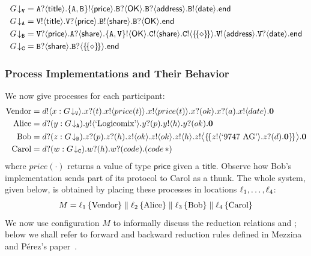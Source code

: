 \documentclass[runningheads,plain]{llncs}
\begin{document}
\begin{align*}
\tproj{G}{\pS} & = \ltinp{A}{\mathsf{title}}{\ltout{\{A,B\}}{\mathsf{price}}{\ltinp{B}{\mathsf{OK}}{\ltinp{B}{\mathsf{address}}{\ltout{B}{\mathsf{date}}{\lend}}}}}
\\
\tproj{G}{\pA} & = \ltout{\pS}{\mathsf{title}}{\ltinp{\pS}{\mathsf{price}}{\ltout{B}{\mathsf{share}}{\ltinp{B}{\mathsf{OK}}{\lend}}}}
\\
\tproj{G}{\pB} & = \ltinp{\pS}{\mathsf{price}}{\ltinp{A}{\mathsf{share}}{\ltout{\{A,\pS\}}{\mathsf{OK}}{
\ltout{C}{\mathsf{share}}{\ltout{C}{\thunkt}{
 \ltout{\pS}{\mathsf{address}}{\ltinp{\pS}{\mathsf{date}}{\lend}}}}}}}
\\
\tproj{G}{\pC} & = \ltinp{B}{\mathsf{share}}{\ltinp{B}{\thunkt}{\lend}}
\end{align*}

\subsubsection{Process Implementations and Their Behavior}
We now give processes for each participant:
\begin{align*}
\text{Vendor} & =  d ! \langle x:G\!\downarrow_{\mathtt{V}} \rangle .x ? (t) .x ! \langle price(t) \rangle .x ! \langle price(t) \rangle . x ? (ok) .x ? (a) . x ! \langle date \rangle .\mathbf{0}  
\\
\text{Alice} & =  d ? (y:G\!\downarrow_{\mathtt{A}}) .y ! \langle \text{`Logicomix'} \rangle .y ? (p) .y ! \langle h \rangle .y ? (ok) .\mathbf{0}  
\\
\text{Bob} & =  d ? (z:G\!\downarrow_{\mathtt{B}}) .z ? (p) .z ? (h) .z ! \langle ok \rangle .z ! \langle ok \rangle .z ! \langle h \rangle .
 z ! \big\langle \{\!\{z ! \langle \text{`9747 AG'} \rangle .z ? (d) .\mathbf{0}\}\!\} \big\rangle .\mathbf{0}
  \\
\text{Carol} & =  d ? (w:G\!\downarrow_{\mathtt{C}}) .w ? (h) .w ? (code) .(code\, {\ast})
\end{align*}
where $price(\cdot)$ returns a value of type $\mathsf{price}$ given a $\mathsf{title}$.
 Observe how Bob's implementation sends part of its protocol to Carol as a thunk.
The whole system, given below, is obtained by placing these processes   in  locations  $\ell_1, \ldots, \ell_4$:
$$
M = \ell_1\left\{\text{Vendor}\right\} 
\parallel
\ell_2\left\{\text{Alice}\right\} 
\parallel
\ell_3\left\{\text{Bob}\right\} 
\parallel 
\ell_4\left\{\text{Carol}\right\} 
$$
We now use configuration $M$ to informally discuss the reduction relations \fw and \bk; below we shall refer to forward and backward reduction rules {defined in Mezzina and P\'{e}rez's paper~\cite[\S\,2.2.2]{DBLP:conf/ppdp/MezzinaP17}}.
\end{document}
